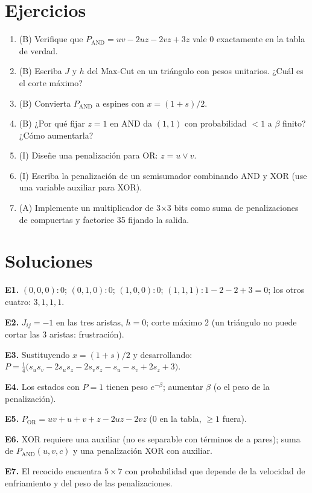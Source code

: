 \documentclass[11pt,a4paper]{article}
\begin{document}
\section{Ejercicios}
\begin{enumerate}[label=\textbf{E\arabic*.}]
\item (B) Verifique que $P_{\text{AND}}=uv-2uz-2vz+3z$ vale 0 exactamente en la tabla de verdad.
\item (B) Escriba $J$ y $h$ del Max-Cut en un triángulo con pesos unitarios. ¿Cuál es el corte máximo?
\item (B) Convierta $P_{\text{AND}}$ a espines con $x=(1+s)/2$.
\item (B) ¿Por qué fijar $z=1$ en AND da $(1,1)$ con probabilidad $<1$ a $\beta$ finito? ¿Cómo aumentarla?
\item (I) Diseñe una penalización para OR: $z=u\vee v$.
\item (I) Escriba la penalización de un semisumador combinando AND y XOR (use una variable auxiliar para XOR).
\item (A) Implemente un multiplicador de 3×3 bits como suma de penalizaciones de compuertas y factorice 35 fijando la salida.
\end{enumerate}
\section{Soluciones}
\begin{solucion}
\textbf{E1.} $(0,0,0)\!:0$; $(0,1,0)\!:0$; $(1,0,0)\!:0$; $(1,1,1)\!:1-2-2+3=0$; los otros cuatro: $3,1,1,1$.

\textbf{E2.} $J_{ij}=-1$ en las tres aristas, $h=0$; corte máximo 2 (un triángulo no puede cortar las 3 aristas: frustración).

\textbf{E3.} Sustituyendo $x=(1+s)/2$ y desarrollando: $P=\tfrac14\big(s_us_v-2s_us_z-2s_vs_z-s_u-s_v+2s_z+3\big)$.

\textbf{E4.} Los estados con $P=1$ tienen peso $e^{-\beta}$; aumentar $\beta$ (o el peso de la penalización).

\textbf{E5.} $P_{\text{OR}}=uv+u+v+z-2uz-2vz$ (0 en la tabla, $\ge1$ fuera).

\textbf{E6.} XOR requiere una auxiliar (no es separable con términos de a pares); suma de $P_{\text{AND}}(u,v,c)$ y una penalización XOR con auxiliar.

\textbf{E7.} El recocido encuentra $5\times7$ con probabilidad que depende de la velocidad de enfriamiento y del peso de las penalizaciones.
\end{solucion}
\end{document}
